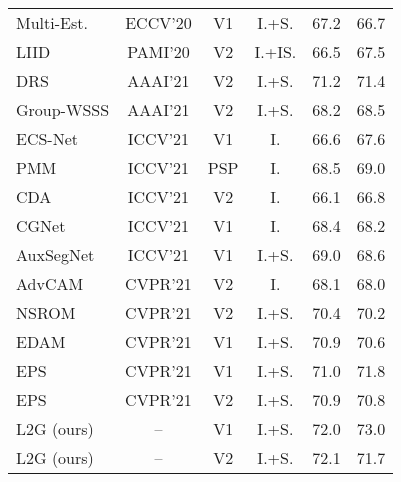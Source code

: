 \documentclass[10pt,twocolumn,letterpaper]{article}
\begin{document}
\begin{table}[t]
{\begin{tabular}{l|c|c|c|c|c}
        Multi-Est. \cite{fan2020employing}          & ECCV'20    & V1  & I.+S.  & 67.2       & 66.7 \\
        LIID \cite{liu2020leveraging}               & PAMI'20    & V2  & I.+IS. & 66.5       & 67.5 \\
        DRS \cite{kim2021discriminative}            & AAAI'21    & V2  & I.+S.  & 71.2       & 71.4 \\
        Group-WSSS \cite{li2021group}               & AAAI'21    & V2  & I.+S.  & 68.2       & 68.5 \\
        ECS-Net \cite{sun2021ecs}                   & ICCV'21    & V1  & I.     & 66.6       & 67.6 \\  
        PMM \cite{li2021pseudo}                     & ICCV'21    & PSP & I.     & 68.5       & 69.0 \\
        CDA \cite{su2021context}                    & ICCV'21    & V2  & I.     & 66.1       & 66.8 \\
        CGNet \cite{kweon2021unlocking}             & ICCV'21    & V1  & I.     & 68.4       & 68.2 \\  
        AuxSegNet \cite{xu2021leveraging}           & ICCV'21    & V1  & I.+S.  & 69.0       & 68.6 \\
        AdvCAM \cite{lee2021anti}                   & CVPR'21    & V2  & I.     & 68.1       & 68.0 \\       
        NSROM \cite{yao2021non}                     & CVPR'21    & V2  & I.+S.  & 70.4       & 70.2 \\ 
        EDAM \cite{wu2021embedded}                  & CVPR'21    & V1  & I.+S.  & 70.9       & 70.6 \\
        EPS \cite{lee2021railroad}                  & CVPR'21    & V1  & I.+S.  & 71.0       & 71.8 \\
        EPS \cite{lee2021railroad}                  & CVPR'21    & V2  & I.+S.  & 70.9       & 70.8 \\
        \rowcolor{gray!32} L2G (ours)               &  --        & V1 & I.+S.  & 72.0       & 73.0 \\
        \rowcolor{gray!32} L2G (ours)               &  --        & V2 & I.+S.  & 72.1       & 71.7 \\
        \bottomrule[1pt]
        \end{tabular} }
        \vspace{-5pt}
\end{table}
\end{document}

